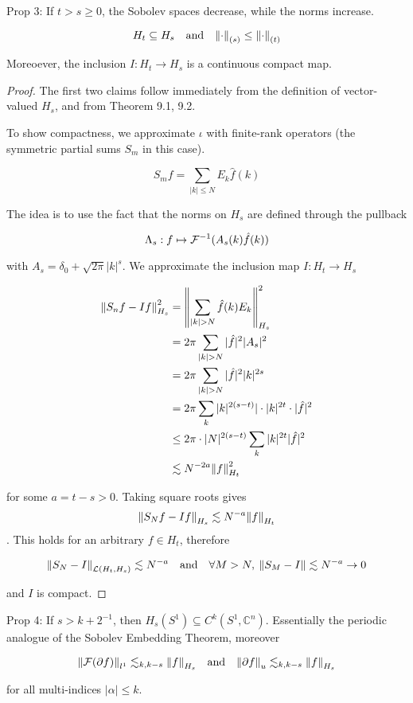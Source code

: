 \documentclass[../main-manifolds.tex]{subfiles}
\begin{document}
\begin{wts}
Prop 3: If $t>s\geq 0$, the Sobolev spaces decrease, while the norms increase.

$$
H_t\subseteq H_s\quad\text{and}\quad \norm{\cdot}_{(s)}\leq\norm{\cdot}_{(t)}
$$

Moreoever, the inclusion $I: H_t\to H_s$ is a continuous compact map.    
\end{wts}
\begin{proof}
The first two claims follow immediately from the definition of vector-valued $H_s$, and from Theorem 9.1, 9.2.

To show compactness, we approximate $\iota$ with finite-rank operators (the symmetric partial sums $S_m$ in this case).

$$
S_m f = \sum_{\vert k\vert \leq N} E_k\hat{f}(k)
$$

The idea is to use the fact that the norms on $H_s$ are defined through the pullback

$$
\Lambda_s: f\mapsto \mathcal{F}^{-1}(A_s(k)\hat{f}(k))
$$

with $A_s = \delta_0 + \sqrt{2\pi}\vert k\vert^{s}$. We approximate the inclusion map $I: H_t\to H_s$


\begin{align}
\norm{S_n f - If}_{H_s}^{2} &= \norm{\sum_{\vert k\vert > N}\hat{f}(k)E_k }_{H_s}^{2}\\
&=2\pi\sum_{\vert k\vert> N}\vert\hat{f}\vert^2\vert A_s\vert^2\\
&=2\pi\sum_{\vert k\vert> N}\vert\hat{f}\vert^2\vert k\vert^{2s}\\
&=2\pi\sum_{k}\vert k\vert^{2(s-t)}\vert\cdot \vert k\vert^{2t}\cdot\vert\hat{f}\vert^2\\
&\leq 2\pi\cdot\vert N\vert^{2(s-t)}\sum_{k}\vert k\vert^{2t}\vert\hat{f}\vert^2\\
&\lesssim N^{-2a}\norm{f}^2_{H_t}
\end{align}


for some $a = t-s > 0$. Taking square roots gives $$\norm{S_N f - If}_{H_s}\lesssim N^{-a}\norm{f}_{H_t}$$. This holds for an arbitrary $f\in H_t$, therefore

$$
\norm{S_N -I}_{\mathcal{L}(H_t, H_s)}\lesssim N^{-a}\quad\text{and}\quad\forall M>N,\: \norm{S_M - I}\lesssim N^{-a}\to 0
$$

and $I$ is compact.    
\end{proof}
\begin{wts}
Prop 4: If $s>k+2^{-1}$, then $H_s(S^1)\subseteq C^k(S^1,\mathbb{C}^n)$. Essentially the periodic analogue of the Sobolev Embedding Theorem, moreover

$$
\norm{\mathcal{F}(\partial f)}_{l^1}\lesssim_{k,k-s}\norm{f}_{H_s}\quad\text{and}\quad \norm{\partial f}_{u}\lesssim_{k,k-s}\norm{f}_{H_s}
$$

for all multi-indices $\vert\alpha\vert\leq k$.     
\end{wts}
\end{document}
